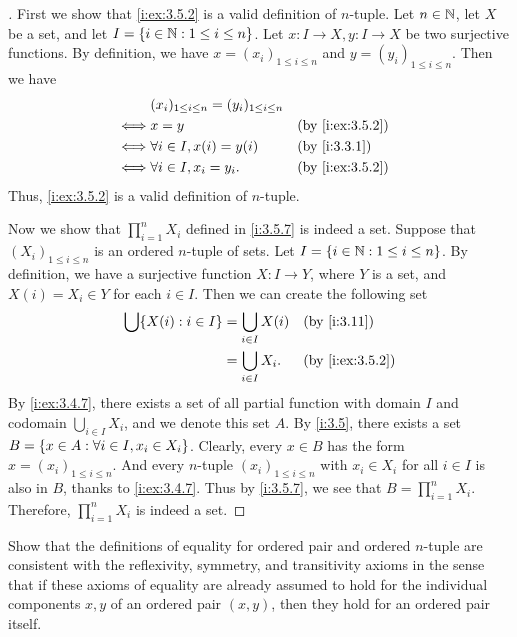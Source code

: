 \begin{proof}[]
  First we show that \cref{i:ex:3.5.2} is a valid definition of \(n\)-tuple.
  Let \(n \in \mathbb{N}\), let \(X\) be a set, and let \(I = \left\lbrace i \in \mathbb{N} : 1 \leq i \leq n\right\rbrace\).
  Let \(x : I \to X, y : I \to X\) be two surjective functions.
  By definition, we have \(x = (x_i)_{1 \leq i \leq n}\) and \(y = (y_i)_{1 \leq i \leq n}\).
  Then we have
  \begin{align*}
         & (x_i)_{1 \leq i \leq n} = (y_i)_{1 \leq i \leq n}                      \\
    \iff & x = y                                             &  & \by{i:ex:3.5.2} \\
    \iff & \forall i \in I, x(i) = y(i)                      &  & \by{i:3.3.1}    \\
    \iff & \forall i \in I, x_i = y_i.                       &  & \by{i:ex:3.5.2}
  \end{align*}
  Thus, \cref{i:ex:3.5.2} is a valid definition of \(n\)-tuple.

  Now we show that \(\prod_{i = 1}^n X_i\) defined in \cref{i:3.5.7} is indeed a set.
  Suppose that \((X_i)_{1 \leq i \leq n}\) is an ordered \(n\)-tuple of sets.
  Let \(I = \left\lbrace i \in \mathbb{N} : 1 \leq i \leq n\right\rbrace\).
  By definition, we have a surjective function \(X : I \to Y\), where \(Y\) is a set, and \(X(i) = X_i \in Y\) for each \(i \in I\).
  Then we can create the following set
  \begin{align*}
    \bigcup \set{X(i) : i \in I} & = \bigcup_{i \in I} X(i) &  & \by{i:3.11}     \\
                                 & = \bigcup_{i \in I} X_i. &  & \by{i:ex:3.5.2}
  \end{align*}
  By \cref{i:ex:3.4.7}, there exists a set of all partial function with domain \(I\) and codomain \(\bigcup_{i \in I} X_i\), and we denote this set \(A\).
  By \cref{i:3.5}, there exists a set \(B = \left\lbrace x \in A : \forall i \in I, x_i \in X_i\right\rbrace\).
  Clearly, every \(x \in B\) has the form \(x = (x_i)_{1 \leq i \leq n}\).
  And every \(n\)-tuple \((x_i)_{1 \leq i \leq n}\) with \(x_i \in X_i\) for all \(i \in I\) is also in \(B\), thanks to \cref{i:ex:3.4.7}.
  Thus by \cref{i:3.5.7}, we see that \(B = \prod_{i = 1}^n X_i\).
  Therefore, \(\prod_{i = 1}^n X_i\) is indeed a set.
\end{proof}

\begin{ex}\label{i:ex:3.5.3}
  Show that the definitions of equality for ordered pair and ordered \(n\)-tuple are consistent with the reflexivity, symmetry, and transitivity axioms in the sense that if these axioms of equality are already assumed to hold for the individual components \(x, y\) of an ordered pair \((x, y)\), then they hold for an ordered pair itself.
\end{ex}

